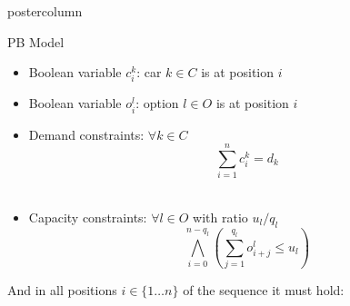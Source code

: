 \documentclass[final]{beamer}
\begin{document}
\begin{frame}
\begin{columns}
\begin{column}{.49\textwidth}
\begin{beamercolorbox}[center,wd=\textwidth]{postercolumn}
\begin{minipage}[T]{.95\textwidth}
{
            \vfill
            \begin{block}{PB Model}
                \begin{itemize}
                \itemsep1pt\parskip0pt
                \item
                  Boolean variable $c^k_i$: car $k\in C$ is at position $i$
                \item
                  Boolean variable $o^l_i$: option $l\in O$ is at position $i$
                \item
                  Demand constraints: $\forall k \in C$ \[\sum^n_{i=1} c^k_i = d_k\]\\
                \item
                  Capacity constraints: $\forall l \in O$ with ratio $u_l/q_l$
                  \[\bigwedge_{i=0}^{n-q_l}(\sum_{j=1}^{q_l} o^l_{i+j} \leq u_l )\]
                \end{itemize}
                
                And in all positions $i \in \{1\ldots n\}$ of the sequence it must hold:
                

\end{block}}
\end{minipage}
\end{beamercolorbox}
\end{column}
\end{columns}
\end{frame}
\end{document}
